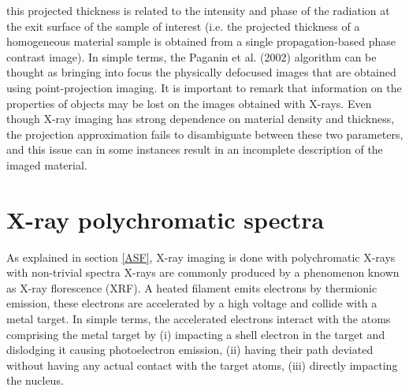 \documentclass[10pt, a4paper, singlespacing]{report}
\begin{document}
this projected thickness is related to the intensity and phase of the radiation at the exit surface of the sample of interest (i.e. the projected thickness of a homogeneous material sample is obtained from a single propagation-based phase contrast image).
In simple terms, the Paganin et al. (2002) algorithm can be thought as bringing into focus the physically defocused images that are obtained using point-projection imaging\cite{Pags2002}.
It is important to remark that information on the properties of objects may be lost on the images obtained with X-rays. Even though X-ray imaging has strong dependence on material density and thickness\cite{CH49}, the projection approximation fails to disambiguate between these two parameters, and this issue can in some instances result in an incomplete description of the imaged material.
\section{X-ray polychromatic spectra}\label{poly}
As explained in section \ref{ASF}, X-ray imaging is done with polychromatic X-rays with non-trivial spectra\cite{CH49}
X-rays are commonly produced by a phenomenon known as X-ray florescence (XRF). A heated filament emits electrons by thermionic emission, these electrons are accelerated by a high voltage and collide with a metal target. In simple terms, the accelerated electrons interact with the atoms comprising the metal target by (i) impacting a shell electron in the target and dislodging it causing photoelectron emission, (ii) having their path deviated without having any actual contact with the target atoms, (iii) directly impacting the nucleus.
\end{document}
